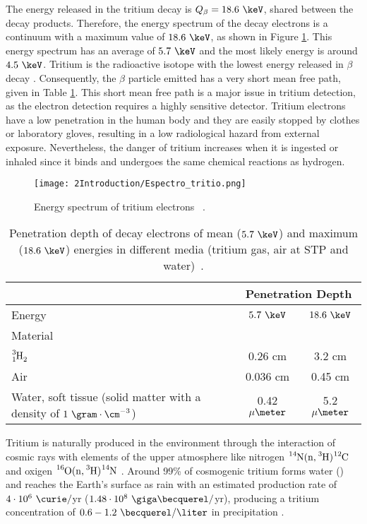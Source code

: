 The energy released in the tritium decay is $Q_\beta=18.6~\keV$, shared between the decay products. Therefore, the energy spectrum of the decay electrons is a continuum with a maximum value of $18.6~\keV$, as shown in Figure \ref{fig:TritiumDecaySpectrum}. This energy spectrum has an average of $5.7~\keV$ and the most likely energy is around $4.5~\keV$. Tritium is the radioactive isotope with the lowest energy released in $\beta$ decay \cite{TritiumHandling}. Consequently, the $\beta$ particle emitted has a very short mean free path, given in Table \ref{tab:MeanFreePathTritium}. This short mean free path is a major issue in tritium detection, as the electron detection requires a highly sensitive detector. Tritium electrons have a low penetration in the human body and they are easily stopped by clothes or laboratory gloves, resulting in a low radiological hazard from external exposure. Nevertheless, the danger of tritium increases when it is ingested or inhaled since it binds and undergoes the same chemical reactions as hydrogen.

\begin{figure}[h]
\texttt{[image: 2Introduction/Espectro\_tritio.png]}
\centering
\caption{Energy spectrum of tritium electrons ~\cite{TritiumEspectrum}.\label{fig:TritiumDecaySpectrum}}
\end{figure}

\begin{table}[htbp]
\centering{}%
\begin{tabular}{lcc}
\toprule 
 & \multicolumn{2}{c}{Penetration Depth} \tabularnewline
\midrule
Energy & $5.7~\keV$ & $18.6~\keV$ \tabularnewline
Material \tabularnewline
\midrule
\midrule 
$\ce{\ce{^{3}_{1}H_2}}$ & 0.26 cm & 3.2 cm \tabularnewline
Air & 0.036 cm & 0.45 cm \tabularnewline
\parbox{10em}{ Water, soft tissue\\  (solid matter with a \\  density of $1~\gram\cdot\cm^{-3}$)} & 0.42 $\mu\meter$ & 5.2 $\mu\meter$ \tabularnewline
\bottomrule
\end{tabular}
\caption{Penetration depth of decay electrons of mean ($5.7~\keV$) and maximum ($18.6~\keV$) energies in different media (tritium gas, air at STP and water)~\cite{MeanFreePathDocument}.}
\label{tab:MeanFreePathTritium}
\end{table} 

Tritium is naturally produced in the environment through the interaction of cosmic rays with elements of the upper atmosphere like nitrogen $\ce{^{14}N}(\ce{n},\ce{^{3}H})\ce{^{12}C}$ \cite{TritiumHandling} and oxigen $\ce{^{16}O}(\ce{n},\ce{^{3}H})\ce{^{14}N}$ \cite{OxigenTritium}. Around 99\% of cosmogenic tritium forms water () and reaches the Earth's surface as rain with an estimated production rate of $4\cdot 10^6 ~\curie/$yr ($1.48 \cdot 10^8 ~\giga\becquerel/$yr), producing a tritium concentration of $0.6-1.2~\becquerel/\liter$ in precipitation \cite{CommonEmissionTritium, TritiumHandling}. 

